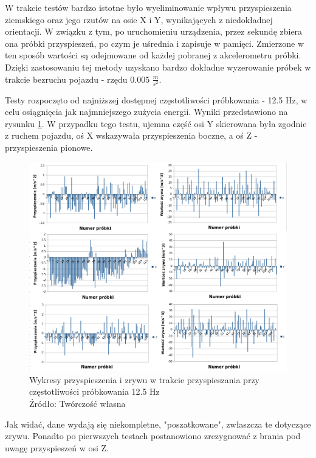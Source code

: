 W trakcie testów bardzo istotne było wyeliminowanie wpływu przyspieszenia ziemskiego oraz jego rzutów na osie X i Y, wynikających z niedokładnej orientacji. W związku z tym, po uruchomieniu urządzenia, przez sekundę zbiera ona próbki przyspieszeń, po czym je uśrednia i zapisuje w pamięci. Zmierzone w ten sposób wartości są odejmowane od każdej pobranej z akcelerometru próbki. Dzięki zastosowaniu tej metody uzyskano bardzo dokładne wyzerowanie próbek w trakcie bezruchu pojazdu - rzędu 0.005 $\frac{m}{s^2}$.

Testy rozpoczęto od najniższej dostępnej częstotliwości próbkowania - 12.5 Hz, w celu osiągnięcia jak najmniejszego zużycia energii. Wyniki przedstawiono na rysunku \ref{fig:image_driving_analysis_test_12Hz}. W przypadku tego testu, ujemna część osi Y skierowana była zgodnie z ruchem pojazdu, oś X wskazywała przyspieszenia boczne, a oś Z - przyspieszenia pionowe.

\begin{figure}[H]
	\centering
	\includegraphics[width=16cm]{img/driving_analysis/12_5Hz_Przyspieszanie.png}
	\caption{Wykresy przyspieszenia i zrywu w trakcie przyspieszania przy częstotliwości próbkowania 12.5 Hz
	\\Źródło: Twórczość własna}
	\label{fig:image_driving_analysis_test_12Hz}
\end{figure}

Jak widać, dane wydają się niekompletne, "poszatkowane", zwłaszcza te dotyczące zrywu. Ponadto po pierwszych testach postanowiono zrezygnować z brania pod uwagę przyspieszeń w osi Z.

